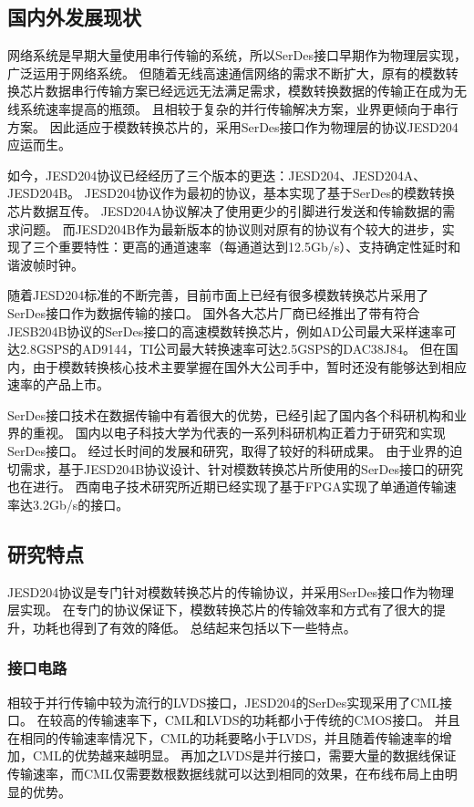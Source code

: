 \documentclass[UTF8]{ctexart}
\begin{document}
\subsection{国内外发展现状}

网络系统是早期大量使用串行传输的系统，所以SerDes接口早期作为物理层实现，广泛运用于网络系统。
但随着无线高速通信网络的需求不断扩大，原有的模数转换芯片数据串行传输方案已经远远无法满足需求，模数转换数据的传输正在成为无线系统速率提高的瓶颈。
且相较于复杂的并行传输解决方案，业界更倾向于串行方案。
因此适应于模数转换芯片的，采用SerDes接口作为物理层的协议JESD204应运而生。

如今，JESD204协议已经经历了三个版本的更迭：JESD204、JESD204A、JESD204B。
JESD204协议作为最初的协议，基本实现了基于SerDes的模数转换芯片数据互传。
JESD204A协议解决了使用更少的引脚进行发送和传输数据的需求问题。
而JESD204B作为最新版本的协议则对原有的协议有个较大的进步，实现了三个重要特性：更高的通道速率（每通道达到12.5Gb/s）、支持确定性延时和谐波帧时钟。\cite{Beavers2014}

随着JESD204标准的不断完善，目前市面上已经有很多模数转换芯片采用了SerDes接口作为数据传输的接口。
国外各大芯片厂商已经推出了带有符合JESB204B协议的SerDes接口的高速模数转换芯片，例如AD公司最大采样速率可达2.8GSPS的AD9144\cite{ad9144AD}，TI公司最大转换速率可达2.5GSPS的DAC38J84\cite{DAC38J84TI}。
但在国内，由于模数转换核心技术主要掌握在国外大公司手中，暂时还没有能够达到相应速率的产品上市。

SerDes接口技术在数据传输中有着很大的优势，已经引起了国内各个科研机构和业界的重视。
国内以电子科技大学为代表的一系列科研机构正着力于研究和实现SerDes接口。
经过长时间的发展和研究，取得了较好的科研成果。
由于业界的迫切需求，基于JESD204B协议设计、针对模数转换芯片所使用的SerDes接口的研究也在进行。
西南电子技术研究所近期已经实现了基于FPGA实现了单通道传输速率达3.2Gb/s的接口\cite{zhangf2014}。

\subsection{研究特点}

JESD204协议是专门针对模数转换芯片的传输协议，并采用SerDes接口作为物理层实现。
在专门的协议保证下，模数转换芯片的传输效率和方式有了很大的提升，功耗也得到了有效的降低。
总结起来包括以下一些特点。

\subsubsection{接口电路}

相较于并行传输中较为流行的LVDS接口，JESD204的SerDes实现采用了CML接口。
在较高的传输速率下，CML和LVDS的功耗都小于传统的CMOS接口。
并且在相同的传输速率情况下，CML的功耗要略小于LVDS，并且随着传输速率的增加，CML的优势越来越明显。
再加之LVDS是并行接口，需要大量的数据线保证传输速率，而CML仅需要数根数据线就可以达到相同的效果，在布线布局上由明显的优势。
\end{document}
